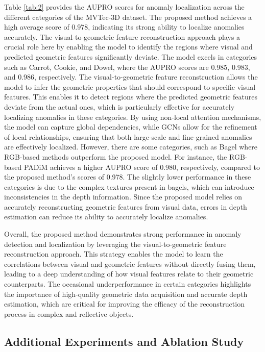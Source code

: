 Table \ref{tab:2} provides the AUPRO scores for anomaly localization across the different categories of the MVTec-3D dataset. The proposed method achieves a high average score of 0.978, indicating its strong ability to localize anomalies accurately. The visual-to-geometric feature reconstruction approach plays a crucial role here by enabling the model to identify the regions where visual and predicted geometric features significantly deviate. The model excels in categories such as Carrot, Cookie, and Dowel, where the AUPRO scores are 0.985, 0.983, and 0.986, respectively. The visual-to-geometric feature reconstruction allows the model to infer the geometric properties that should correspond to specific visual features. This enables it to detect regions where the predicted geometric features deviate from the actual ones, which is particularly effective for accurately localizing anomalies in these categories. By using non-local attention mechanisms, the model can capture global dependencies, while GCNs allow for the refinement of local relationships, ensuring that both large-scale and fine-grained anomalies are effectively localized. However, there are some categories, such as Bagel where RGB-based methods outperform the proposed model. For instance, the RGB-based PADiM achieves a higher AUPRO score of 0.980, respectively, compared to the proposed method's scores of 0.978. The slightly lower performance in these categories is due to the complex textures present in bagels, which can introduce inconsistencies in the depth information. Since the proposed model relies on accurately reconstructing geometric features from visual data, errors in depth estimation can reduce its ability to accurately localize anomalies. 

Overall, the proposed method demonstrates strong performance in anomaly detection and localization by leveraging the visual-to-geometric feature reconstruction approach. This strategy enables the model to learn the correlations between visual and geometric features without directly fusing them, leading to a deep understanding of how visual features relate to their geometric counterparts. The occasional underperformance in certain categories highlights the importance of high-quality geometric data acquisition and accurate depth estimation, which are critical for improving the efficacy of the reconstruction process in complex and reflective objects.

\subsection*{Additional Experiments and Ablation Study}

